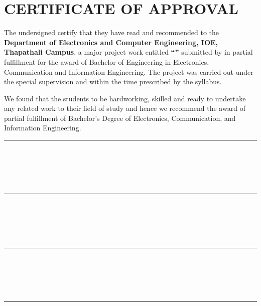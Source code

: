 \chapter*{CERTIFICATE OF APPROVAL}
{}

\noindent The undersigned certify that they have read and recommended to the
\textbf{Department of Electronics and Computer Engineering, IOE, Thapathali Campus},
a major project work entitled \textbf{``\cTitle''} submitted by
\textbf{\authorList} in partial fulfillment for the award of Bachelor of
Engineering in Electronics, Communication and Information Engineering.
The project was carried out under the special supervision and within the time
prescribed by the syllabus.

\vspace{1em}

We found that the students to be hardworking, skilled and ready to undertake
any related work to their field of study and hence we recommend the award of
partial fulfillment of Bachelor's Degree of Electronics, Communication, and
Information Engineering.

\vspace{2em}

\noindent
\begin{minipage}[t]{0.48\textwidth}
    \rule{6cm}{0.2mm} \\
    \cSupervisorTitle \\
    \cSupervisor \\
    \cSupervisorDept \\
    \cSupervisorAddress
\end{minipage}
\hfill
\begin{minipage}[t]{0.48\textwidth}
    \rule{6cm}{0.2mm} \\
    \cExternalExaminerTitle \\
    \cExternalExaminer \\
    \cExternalExaminerDept \\
    \cExternalExaminerAddress
\end{minipage}

\vspace{3em}

\noindent
\begin{minipage}[t]{0.48\textwidth}
    \rule{6cm}{0.2mm} \\
    \cProjectCoordinatorTitle \\
    \cProjectCoordinator \\
    \cProjectCoordinatorDept \\
    \cProjectCoordinatorAddress
\end{minipage}
\hfill
\begin{minipage}[t]{0.48\textwidth}
    \rule{6cm}{0.2mm} \\
    \cHODTitle \\
    \cHOD \\
    \cHODDept \\
    \cHODAddress
\end{minipage}

\vspace{2em}

\noindent\cDate
